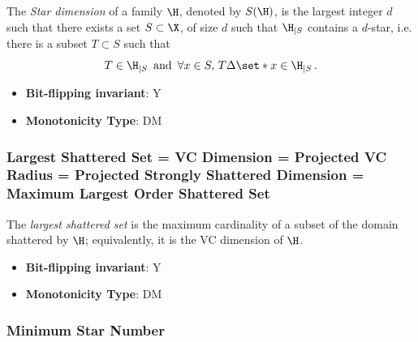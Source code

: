       \begin{definition}[Star number = Maximum Projected Teaching Set Size = Projected Maximal Degree - {\begin{tabular}{l}$\mathrm{S} = \mathrm{TS}_{\max}^p = \mathrm{d}^p_{\max}$\end{tabular}}]\label{def:star_number_=_maximum_projected_teaching_set_size_=_projected_maximal_degree}
      The {\em Star dimension} of a family $\H$, denoted by $S(\H)$, is the largest integer $d$ such that there exists a set $S\subset \X$, of size $d$ such that $\H_{|S}$ contains a $d$-star, i.e. there is a subset $T\subset S$ such that \[ T\in \H_{|S} \,\mbox{ and }\, \forall x\in S,\, T\Delta \set*{x} \in \H_{|S}\,. \]
      \end{definition}
      \begin{itemize}
      \item {\bf Bit-flipping invariant}: Y
      \item {\bf Monotonicity Type}: DM
      \end{itemize}
\subsubsection{Largest Shattered Set = VC Dimension = Projected VC Radius = Projected Strongly Shattered Dimension = Maximum Largest Order Shattered Set}
      
      \begin{definition}[Largest Shattered Set = VC Dimension = Projected VC Radius = Projected Strongly Shattered Dimension = Maximum Largest Order Shattered Set - {\begin{tabular}{l}$\mathrm{SH} = \mathrm{VC} = \mathrm{VCR}^p$\\$= \mathrm{ST}^p = \mathrm{OSH}_{\max}$\end{tabular}}]\label{def:largest_shattered_set_=_vc_dimension_=_projected_vc_radius_=_projected_strongly_shattered_dimension_=_maximum_largest_order_shattered_set}
      The \emph{largest shattered set} is the maximum cardinality of a subset of the domain shattered by $\H$; equivalently, it is the VC dimension of $\H$.
      \end{definition}
      \begin{itemize}
      \item {\bf Bit-flipping invariant}: Y
      \item {\bf Monotonicity Type}: DM
      \end{itemize}
\subsubsection{Minimum Star Number}

